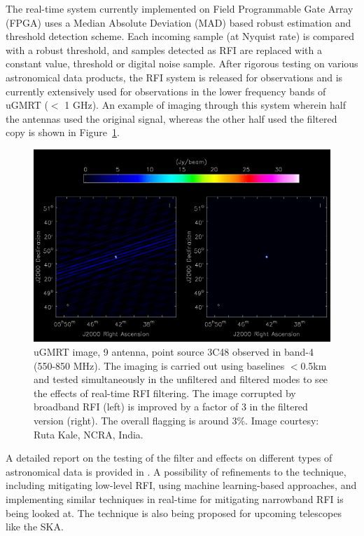 \begin{itemize}
The real-time system currently implemented on Field Programmable Gate Array (FPGA) \citep{buch2019real} uses a Median Absolute Deviation (MAD) based robust estimation and threshold detection scheme. Each incoming sample (at Nyquist rate) is compared with a robust threshold, and samples detected as RFI are replaced with a constant value, threshold or digital noise \citep{buch2014variable} sample. After rigorous testing on various astronomical data products, the RFI system is released for observations and is currently extensively used for observations in the lower frequency bands of uGMRT ($<$ 1 GHz). An example of imaging through this system wherein half the antennas used the original signal, whereas the other half used the filtered copy \citep{buch2022performance} is shown in Figure~\ref{fig:ugmrt-b4-image}. 

\begin{figure}
    \includegraphics[scale=0.4]{Hardware Excision Techniques/figures/band4_point_source_rfi_filtering.png}
    \caption{uGMRT image, 9 antenna, point source 3C48 observed in band-4 (550-850 MHz). The imaging is carried out using baselines $<$0.5km and tested simultaneously in the unfiltered and filtered modes to see the effects of real-time RFI filtering. The image corrupted by broadband RFI (left) is improved by a factor of 3 in the filtered version (right). The overall flagging is around 3\%. Image courtesy: Ruta Kale, NCRA, India.
}
    \label{fig:ugmrt-b4-image}
\end{figure}

A detailed report on the testing of the filter and effects on different types of astronomical data is provided in \citep{kale2025real, lal2025examining}. A possibility of refinements to the technique, including mitigating low-level RFI, using machine learning-based approaches, and implementing similar techniques in real-time for mitigating narrowband RFI \citep{buch2016towards, buch2016real} is being looked at. The technique is also being proposed \citep{buch2023real}for upcoming telescopes like the SKA. %


\end{itemize}
